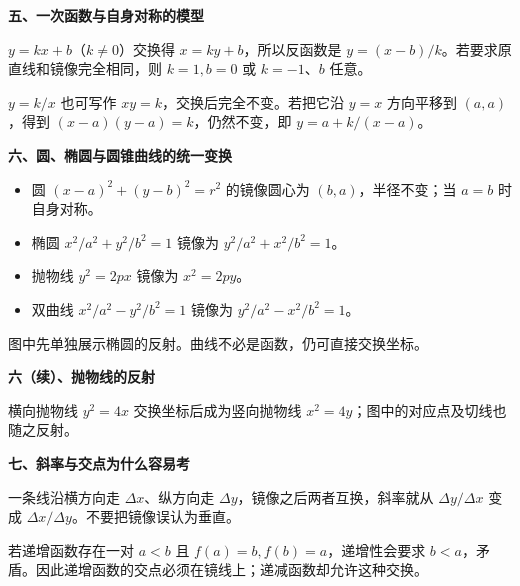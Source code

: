 \clearpage
\begin{explanationbox}
\textbf{\textcolor{CExplanation}{五、一次函数与自身对称的模型}}


$y=kx+b$（$k\ne0$）交换得 $x=ky+b$，所以反函数是 $y=(x-b)/k$。若要求原直线和镜像完全相同，则 $k=1,b=0$ 或 $k=-1$、$b$ 任意。

$y=k/x$ 也可写作 $xy=k$，交换后完全不变。若把它沿 $y=x$ 方向平移到 $(a,a)$，得到 $(x-a)(y-a)=k$，仍然不变，即 $y=a+k/(x-a)$。
\end{explanationbox}
\clearpage
\begin{explanationbox}
\textbf{\textcolor{CExplanation}{六、圆、椭圆与圆锥曲线的统一变换}}


\begin{itemize}[leftmargin=*,itemsep=.4em]
\item 圆 $(x-a)^2+(y-b)^2=r^2$ 的镜像圆心为 $(b,a)$，半径不变；当 $a=b$ 时自身对称。
\item 椭圆 $x^2/a^2+y^2/b^2=1$ 镜像为 $y^2/a^2+x^2/b^2=1$。
\item 抛物线 $y^2=2px$ 镜像为 $x^2=2py$。
\item 双曲线 $x^2/a^2-y^2/b^2=1$ 镜像为 $y^2/a^2-x^2/b^2=1$。
\end{itemize}
图中先单独展示椭圆的反射。曲线不必是函数，仍可直接交换坐标。
\end{explanationbox}
\clearpage
\begin{explanationbox}
\textbf{\textcolor{CExplanation}{六（续）、抛物线的反射}}


横向抛物线 $y^2=4x$ 交换坐标后成为竖向抛物线 $x^2=4y$；图中的对应点及切线也随之反射。
\end{explanationbox}
\clearpage
\begin{explanationbox}
\textbf{\textcolor{CExplanation}{七、斜率与交点为什么容易考}}


一条线沿横方向走 $\Delta x$、纵方向走 $\Delta y$，镜像之后两者互换，斜率就从 $\Delta y/\Delta x$ 变成 $\Delta x/\Delta y$。不要把镜像误认为垂直。

若递增函数存在一对 $a<b$ 且 $f(a)=b,f(b)=a$，递增性会要求 $b<a$，矛盾。因此递增函数的交点必须在镜线上；递减函数却允许这种交换。
\end{explanationbox}
